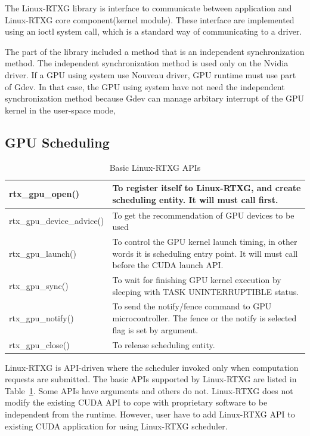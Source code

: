 The Linux-RTXG library is interface to communicate between application and Linux-RTXG core component(kernel module).
These interface are implemented using an ioctl system call, which is a standard way of communicating to a driver.

The part of the library included a method that is an independent synchronization method.
The independent synchronization method is used only on the Nvidia driver.
If a GPU using system use Nouveau driver, GPU runtime must use part of Gdev.
In that case, the GPU using system have not need the independent synchronization method because Gdev can manage arbitary interrupt of the GPU kernel in the user-space mode,

\subsection{GPU Scheduling}
\begin{table}[t]
\begin{center}
\caption{Basic Linux-RTXG APIs}
\label{tab:rtx-api}
\begin{tabular}{|l|p{50em}|} \hline
rtx\_gpu\_open() & To register itself to Linux-RTXG, and create scheduling entity. It will must call first. \\ \hline
rtx\_gpu\_device\_advice() & To get the recommendation of GPU devices to be used \\ \hline
rtx\_gpu\_launch() & To control the GPU kernel launch timing, in other words it is scheduling entry point. It will must call before the CUDA launch API. \\ \hline
rtx\_gpu\_sync() & To wait for finishing GPU kernel execution by sleeping with TASK UNINTERRUPTIBLE status.\\ \hline
rtx\_gpu\_notify() & To send the notify/fence command to GPU microcontroller. The fence or the notify is selected flag is set by argument.\\ \hline
rtx\_gpu\_close() & To release scheduling entity.\\ \hline
\end{tabular}
\end{center}
\end{table}

Linux-RTXG is API-driven where the scheduler invoked only when computation requests are submitted.
The basic APIs supported by Linux-RTXG are listed in Table~\ref{tab:rtx-api}.
Some APIs have arguments and others do not.
Linux-RTXG does not modify the existing CUDA API to cope with proprietary software to be independent from the runtime.
However, user have to add Linux-RTXG API to existing CUDA application for using Linux-RTXG scheduler.

